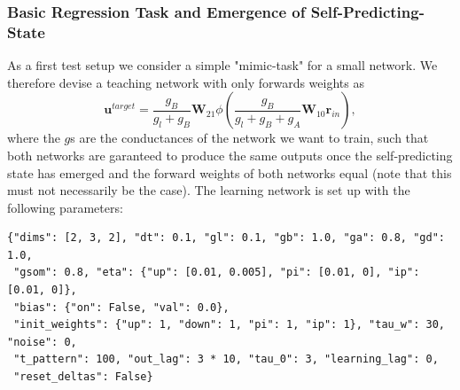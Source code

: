 \documentclass[12pt,a4paper]{article}
\begin{document}
\subsubsection{Basic Regression Task and Emergence of Self-Predicting-State}
\begin{figure}[!ht]
  \centering
  \quad
  \quad
  \quad
  \label{fig:mimic}
\end{figure}

As a first test setup we consider a simple "mimic-task" for a small network. We therefore devise a teaching network with only forwards weights as 
\begin{equation}
\bm{u}^{target} = \frac{g_B}{g_l + g_B} \bm{W}_{21}\phi\left(\frac{g_B}{g_l + g_B + g_A} \bm{W}_{10} \bm{r}_{in}\right),
\end{equation}
where the $g$s are the conductances of the network we want to train, such that both networks are garanteed to produce the same outputs once the self-predicting state has emerged and the forward weights of both networks equal (note that this must not necessarily be the case). The learning network is set up with the following parameters:
\begin{verbatim}
{"dims": [2, 3, 2], "dt": 0.1, "gl": 0.1, "gb": 1.0, "ga": 0.8, "gd": 1.0,
 "gsom": 0.8, "eta": {"up": [0.01, 0.005], "pi": [0.01, 0], "ip": [0.01, 0]},
 "bias": {"on": False, "val": 0.0},
 "init_weights": {"up": 1, "down": 1, "pi": 1, "ip": 1}, "tau_w": 30, "noise": 0,
 "t_pattern": 100, "out_lag": 3 * 10, "tau_0": 3, "learning_lag": 0,
 "reset_deltas": False}
\end{verbatim}
\end{document}
